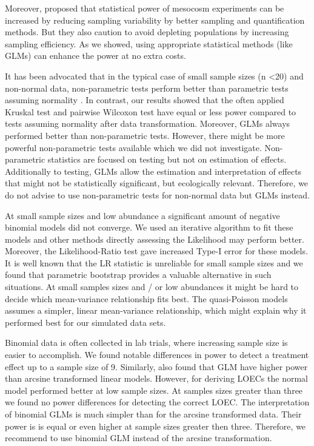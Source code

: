 \documentclass{scrartcl}
\begin{document}
Moreover, \citet{brock_minimum_2015} proposed that statistical power of mesocosm experiments can be increased by reducing sampling variability by better sampling and quantification methods. 
But they also caution to avoid depleting populations by increasing sampling efficiency.
As we showed, using appropriate statistical methods (like GLMs) can enhance the power at no extra costs.

It has been advocated that in the typical case of small sample sizes (n \textless 20) and non-normal data, non-parametric tests perform better than parametric tests assuming normality \citep{wang_making_2011}.
In contrast, our results showed that the often applied Kruskal test and pairwise Wilcoxon test have equal or less power compared to tests assuming normality after data transformation.
Moreover, GLMs always performed better than non-parametric tests. 
However, there might be more powerful non-parametric tests available \citep{konietschke_rank-based_2012} which we did not investigate.
Non-parametric statistics are focused on testing but not on estimation of effects.
Additionally to testing, GLMs allow the estimation and interpretation of effects that might not be statistically significant, but ecologically relevant.
Therefore, we do not advise to use non-parametric tests for non-normal data but GLMs instead.

At small sample sizes and low abundance a significant amount of negative binomial models did not converge.
We used an iterative algorithm to fit these models \citep{venables_modern_2002} and other methods directly assessing the Likelihood may perform better.
Moreover, the Likelihood-Ratio test gave increased Type-I error for these models.
It is well known that the LR statistic is unreliable for small sample sizes \citep{bolker_generalized_2009,wilks_large-sample_1938} and we found that parametric bootstrap provides a valuable alternative in such situations.
At small samples sizes and / or low abundances it might be hard to decide which mean-variance relationship fits best.
The quasi-Poisson models assumes a simpler, linear mean-variance relationship, which might explain why it performed best for our simulated data sets. 


Binomial data is often collected in lab trials, where increasing sample size is easier to accomplish. 
We found notable differences in power to detect a treatment effect up to a sample size of 9.
Similarly, \citet{warton_arcsine_2011} also found that GLM have higher power than arcsine transformed linear models.
However, for deriving LOECs the normal model performed better at low sample sizes. At samples sizes greater than three we found no power differences for detecting the correct LOEC.
The interpretation of binomial GLMs is much simpler than for the arcsine transformed data.
Their power is is equal or even higher at sample sizes greater then three. 
Therefore, we recommend to use binomial GLM instead of the arcsine transformation.
\end{document}
